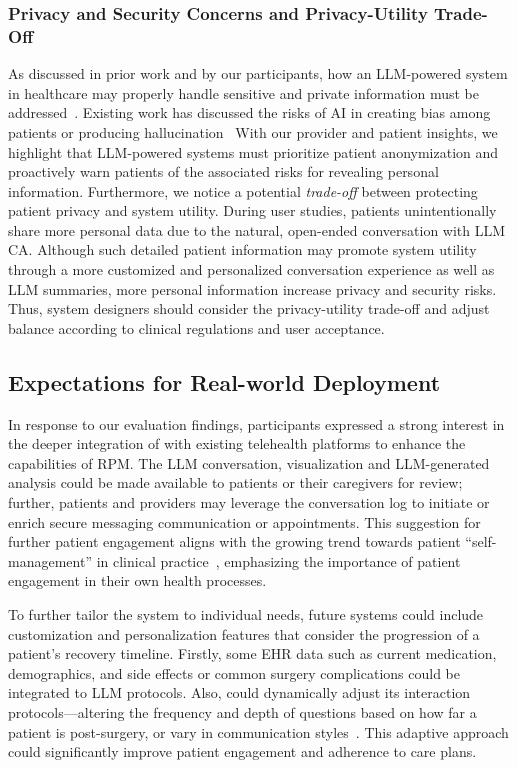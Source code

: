 \subsubsection{Privacy and Security Concerns and Privacy-Utility Trade-Off}

As discussed in prior work and by our participants, how an LLM-powered system in healthcare may properly handle sensitive and private information must be addressed~\cite{murdoch2021privacy,cohen2019big}. Existing work has discussed the risks of AI in creating bias among patients or producing hallucination~\cite{choudhury2020role,lee2023benefits,haupt2023ai}
With our provider and patient insights, we highlight that LLM-powered systems must prioritize patient anonymization and proactively warn patients of the associated risks for revealing personal information. Furthermore, we notice a potential \textit{trade-off} between protecting patient privacy and system utility. During user studies, patients unintentionally share more personal data due to the natural, open-ended conversation with LLM CA. Although such detailed patient information may promote system utility through a more customized and personalized conversation experience as well as LLM summaries, more personal information increase privacy and security risks. Thus, system designers should consider the privacy-utility trade-off and adjust balance according to clinical regulations and user acceptance.

\subsection{Expectations for Real-world Deployment}

In response to our evaluation findings, participants expressed a strong interest in the deeper integration of \projectname{} with existing telehealth platforms to enhance the capabilities of RPM. The LLM conversation, visualization and LLM-generated analysis could be made available to patients or their caregivers for review; further, patients and providers may leverage the conversation log to initiate or enrich secure messaging communication or appointments. This suggestion for further patient engagement aligns with the growing trend towards patient ``self-management'' in clinical practice~\cite{salmiharnessing}, emphasizing the importance of patient engagement in their own health processes.

To further tailor the system to individual needs, future systems could include customization and personalization features that consider the progression of a patient’s recovery timeline. Firstly, some EHR data such as current medication, demographics, and side effects or common surgery complications could be integrated to LLM protocols. Also, \projectname{} could dynamically adjust its interaction protocols—altering the frequency and depth of questions based on how far a patient is post-surgery, or vary in communication styles~\cite{wester2024facing}. This adaptive approach could significantly improve patient engagement and adherence to care plans.

